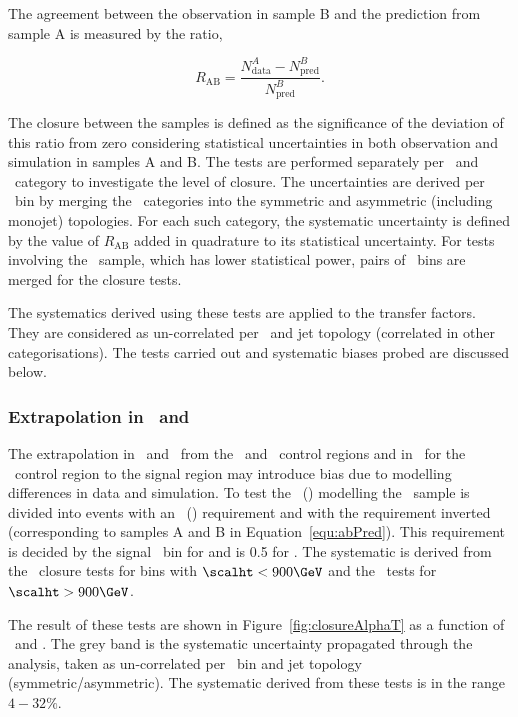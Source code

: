 The agreement between the observation in sample B and the prediction from sample A is measured by the ratio, 

\begin{equation}
R_{\text{AB}} = \frac{N^{A}_{\text{data}}-N^{B}_{\text{pred}}}{N^{B}_{\text{pred}}}.
\end{equation}


The closure between the samples is defined as the significance of the deviation of this ratio from zero 
considering statistical uncertainties in both observation and simulation in samples A and B.
The tests are performed separately per \njet~and \scalht~category to investigate the level of closure. 
The uncertainties are derived per \scalht~bin by merging the \njet~categories into 
the symmetric and asymmetric (including monojet) topologies. For each such category, the systematic
uncertainty is defined by the value of $R_{\text{AB}}$ added in quadrature to its statistical uncertainty.
For tests involving the \mmj~sample, which has lower statistical power, pairs of \scalht~bins 
are merged for the closure tests. 

The systematics derived using these tests are applied to the transfer factors. They are considered
as un-correlated per \scalht~and jet topology (correlated in other categorisations). The tests carried 
out and systematic biases probed are discussed below.

\subsubsection{Extrapolation in \alphat~and \bdphi}

The extrapolation in \alphat~and \bdphi~from the \mj~and \mmj~control regions 
and in \bdphi~for the \gj~control region to the signal region may introduce bias
 due to modelling differences in data and simulation. To test the \alphat~(\bdphi) modelling the \mj~sample is divided 
into events with an \alphat~(\bdphi) requirement and with the requirement inverted (corresponding
to samples A and B in Equation~\ref{equ:abPred}). This requirement is decided by the signal \scalht~bin for 
\alphat and is 0.5 for \bdphi. The systematic is derived from the \alphat~closure tests for
bins with $\scalht < 900 \GeV$ and the \bdphi~tests for $\scalht > 900 \GeV$.

The result of these tests are shown in Figure~\ref{fig:closureAlphaT} as a function of \scalht~and \njet. 
The grey band is the systematic uncertainty propagated through the analysis, 
taken as un-correlated per \scalht~bin and jet topology
(symmetric/asymmetric). The systematic derived from these tests is
in the range $4-32\%$.

